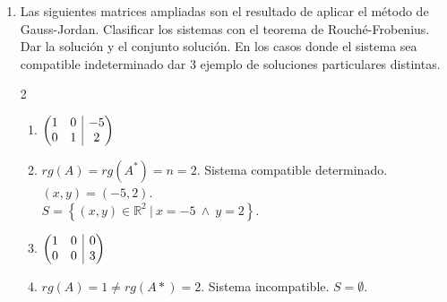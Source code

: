 \documentclass[a4paper]{article}
\makeatletter
\newcommand{\answer}{\item[**]}
\newcommand{\exercise}{\item}
\newenvironment{amatrix}[1]{%
  \left(\begin{array}{@{}*{#1}{c}|c@{}}
}{%
  \end{array}\right)
}
\makeatother
\begin{document}
\begin{enumerate}
\begin{multicols}{2}
\begin{enumerate} [label=(\alph*)]
		\item $\left\{\begin{matrix} 2x-y+15z=3 \\ x-3y-2z=7 \\ x-8y-21z=11 \end{matrix}\right.$
		\answer $rg(A)=2 \neq rg(A^*)=3$. Sistema incompatible. $S=\emptyset$. \\ Resolución por \href{https://youtu.be/__8Vg4ePRr4}{Mates con Andrés}

		\item $\left\{\begin{matrix} 2x-2y+14z-2w=0 \\ 4x-6y-16z+2w=0 \end{matrix}\right.$
		\answer $rg(A)=rg(A)=2<n=4$. Sistema compatible indeterminado cuya solución depende de 2 parámetros. \\ $(x,y,z,w)=\left( -29z+4w,-22z+3w,z,w \right)$. $S=\left\{(x,y,z,w) \in \mathbb{R}^4 ~|~ x=-29z+4w ~\land~ y=-22z+3w \right\}$. \\ Resolución por \href{https://youtu.be/XqKrK9zkwtE}{Ktipio}

	\end{enumerate}
	\end{multicols}

	\exercise Las siguientes matrices ampliadas son el resultado de aplicar el método de Gauss-Jordan. Clasificar los sistemas con el teorema de Rouché-Frobenius. Dar la solución y el conjunto solución. En los casos donde el sistema sea compatible indeterminado dar 3 ejemplo de soluciones particulares distintas.
	\begin{multicols}{2}
	\begin{enumerate} [label=(\alph*)]

		\item $\begin{amatrix}{2} 1 & 0 & -5 \\ 0 & 1 & 2 \end{amatrix}$
		\answer $rg(A)=rg(A^*)=n=2$. Sistema compatible determinado. \\ $(x,y)=(-5,2)$. \\ $S=\left\{(x,y)\in \mathbb{R}^2 ~|~ x=-5 ~\land~ y=2 \right\}$. 

		\item $\begin{amatrix}{2} 1 & 0 & 0 \\ 0 & 0 & 3 \end{amatrix}$
		\answer $rg(A)=1 \neq rg(A*)=2$. Sistema incompatible. $S=\emptyset$.


\end{enumerate}
\end{multicols}
\end{enumerate}
\end{document}

